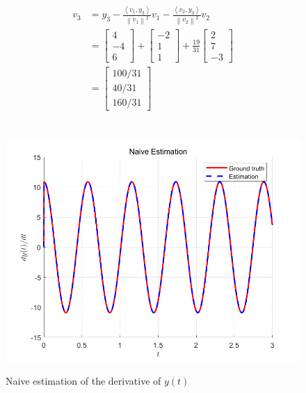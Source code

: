 \documentclass{article}
\theoremstyle{definition} %
\begin{document}
\begin{align*}
    v_3 &=y_3-\frac{\left\langle v_1, y_3\right\rangle}{\left\|v_1\right\|^2} v_1-\frac{\left\langle v_2, y_3\right\rangle}{\left\|v_2\right\|^2} v_2 \\
    &=\left[\begin{array}{c}
    4 \\
    -4 \\
    6
    \end{array}\right]+\left[\begin{array}{c}
    -2 \\
    1 \\
    1
    \end{array}\right]+\frac{19}{31}\left[\begin{array}{c}
    2 \\
    7 \\
    -3
    \end{array}\right] \\
    &=\left[\begin{array}{c}
    100/31 \\ 40/31 \\ 160/31
    \end{array}\right]
\end{align*}


\section{}
\subsection{}
\begin{figure}[H]
    \centering
        \textsf{\includegraphics[width=0.6\columnwidth]{hw6-prob2-fig1.png}}
        \caption{Naive estimation of the derivative of $y(t)$}
        \label{fig: 2-1}
\end{figure}
\end{document}
